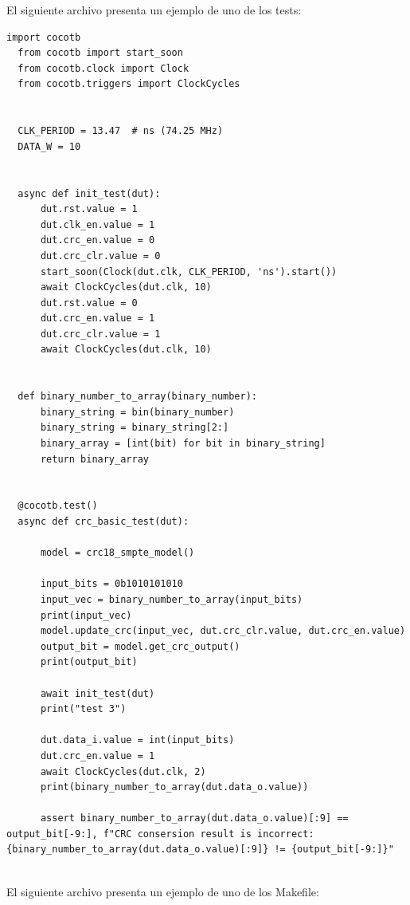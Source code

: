 El siguiente archivo presenta un ejemplo de uno de los tests:

\begin{lstlisting}[caption= "Test de Cocotb de ejemplo"]
  import cocotb
  from cocotb import start_soon
  from cocotb.clock import Clock
  from cocotb.triggers import ClockCycles
  
  
  CLK_PERIOD = 13.47  # ns (74.25 MHz)
  DATA_W = 10
  
  
  async def init_test(dut):
      dut.rst.value = 1
      dut.clk_en.value = 1
      dut.crc_en.value = 0
      dut.crc_clr.value = 0
      start_soon(Clock(dut.clk, CLK_PERIOD, 'ns').start())
      await ClockCycles(dut.clk, 10)
      dut.rst.value = 0
      dut.crc_en.value = 1
      dut.crc_clr.value = 1
      await ClockCycles(dut.clk, 10)
  
  
  def binary_number_to_array(binary_number):
      binary_string = bin(binary_number)
      binary_string = binary_string[2:]
      binary_array = [int(bit) for bit in binary_string]
      return binary_array
  
  
  @cocotb.test()
  async def crc_basic_test(dut):
  
      model = crc18_smpte_model()
  
      input_bits = 0b1010101010
      input_vec = binary_number_to_array(input_bits)
      print(input_vec)
      model.update_crc(input_vec, dut.crc_clr.value, dut.crc_en.value)
      output_bit = model.get_crc_output()
      print(output_bit)
  
      await init_test(dut)
      print("test 3")
  
      dut.data_i.value = int(input_bits)
      dut.crc_en.value = 1
      await ClockCycles(dut.clk, 2)
      print(binary_number_to_array(dut.data_o.value))
  
      assert binary_number_to_array(dut.data_o.value)[:9] == output_bit[-9:], f"CRC consersion result is incorrect: {binary_number_to_array(dut.data_o.value)[:9]} != {output_bit[-9:]}"
  
\end{lstlisting}

El siguiente archivo presenta un ejemplo de uno de los Makefile:

